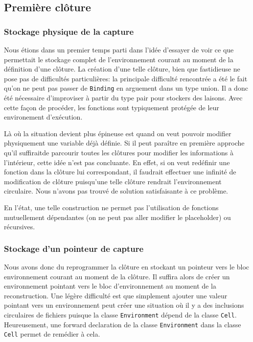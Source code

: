 \documentclass[a4paper,11pt]{article}
\begin{document}
\subsection{Première clôture}

\subsubsection{Stockage physique de la capture}

Nous étions dans un
premier temps parti dans l'idée d'essayer de voir ce que permettait le stockage complet de
l'environnement courant au moment de la définition d'une clôture. La création
d'une telle clôture, bien que fastidieuse ne pose pas de difficultés
particulières: la principale difficulté rencontrée a été le fait qu'on ne peut
pas passer de \texttt{Binding} en arguement dans un type union. Il a donc été
nécessaire d'improviser à partir du type pair pour stockers des laisons. Avec
cette façon de procéder, les fonctions sont typiquement protégée de leur
environement d'exécution.

Là où la situation devient plus épineuse est quand on veut pouvoir modifier
physiquement une variable déjà définie. Si il peut paraître en première approche
qu'il \og suffirait\fg de parcourir toutes les clôtures pour modifier les
informations à l'intérieur, cette idée n'est pas concluante. En effet, si on
veut redéfinir une fonction dans la clôture lui correspondant, il faudrait
effectuer une infinité de modification de clôture puisqu'une telle clôture
rendrait l'environnement circulaire. Nous n'avons pas trouvé de solution
satisfaisante à ce problème.

En l'état, une telle construction ne permet pas l'utilisation de fonctions
mutuellement dépendantes (on ne peut pas aller modifier le placeholder) ou
récursives.

\subsubsection{Stockage d'un pointeur de capture}

Nous avons donc du reprogrammer la clôture en stockant un pointeur vers le bloc
environnement courant au moment de la clôture. Il suffira alors de créer un
environnement pointant vers le bloc d'environnement au moment de la reconstruction.
Une légère difficulté est que simplement ajouter une valeur pointant vers un
environnement peut créer une situation où il y a des inclusions circulaires de
fichiers puisque la classe \texttt{Environment} dépend de la classe \texttt{Cell}.
Heureusement, une forward declaration de la classe \texttt{Environment} dans la classe
\texttt{Cell} permet de remédier à cela.
\end{document}
